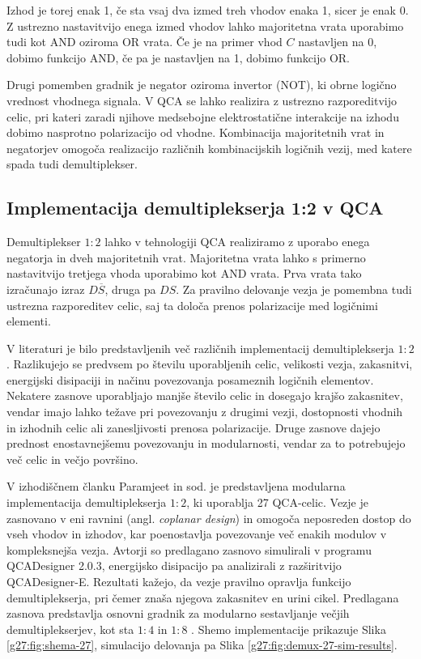 Izhod je torej enak 1, če sta vsaj dva izmed treh vhodov enaka 1, sicer je enak 0. Z ustrezno nastavitvijo enega izmed vhodov lahko majoritetna vrata uporabimo tudi kot AND oziroma OR vrata. Če je na primer vhod $C$ nastavljen na 0, dobimo funkcijo AND, če pa je nastavljen na 1, dobimo funkcijo OR.

Drugi pomemben gradnik je negator oziroma invertor (NOT), ki obrne logično vrednost vhodnega signala. V QCA se lahko realizira z ustrezno razporeditvijo celic, pri kateri zaradi njihove medsebojne elektrostatične interakcije na izhodu dobimo nasprotno polarizacijo od vhodne. Kombinacija majoritetnih vrat in negatorjev omogoča realizacijo različnih kombinacijskih logičnih vezij, med katere spada tudi demultiplekser.

\subsection{Implementacija demultiplekserja 1:2 v QCA}

Demultiplekser $1:2$ lahko v tehnologiji QCA realiziramo z uporabo enega negatorja in dveh majoritetnih vrat. Majoritetna vrata lahko s primerno nastavitvijo tretjega vhoda uporabimo kot AND vrata. Prva vrata tako izračunajo izraz $D\overline{S}$, druga pa $DS$. Za pravilno delovanje vezja je pomembna tudi ustrezna razporeditev celic, saj ta določa prenos polarizacije med logičnimi elementi.

V literaturi je bilo predstavljenih več različnih implementacij demultiplekserja $1:2$. Razlikujejo se predvsem po številu uporabljenih celic, velikosti vezja, zakasnitvi, energijski disipaciji in načinu povezovanja posameznih logičnih elementov. Nekatere zasnove uporabljajo manjše število celic in dosegajo krajšo zakasnitev, vendar imajo lahko težave pri povezovanju z drugimi vezji, dostopnosti vhodnih in izhodnih celic ali zanesljivosti prenosa polarizacije. Druge zasnove dajejo prednost enostavnejšemu povezovanju in modularnosti, vendar za to potrebujejo več celic in večjo površino.

V izhodiščnem članku Paramjeet in sod. \cite{g27:paramjeet2026} je predstavljena modularna implementacija demultiplekserja $1:2$, ki uporablja 27 QCA-celic. Vezje je zasnovano v eni ravnini (angl. \textit{coplanar design}) in omogoča neposreden dostop do vseh vhodov in izhodov, kar poenostavlja povezovanje več enakih modulov v kompleksnejša vezja. Avtorji so predlagano zasnovo simulirali v programu QCADesigner 2.0.3, energijsko disipacijo pa analizirali z razširitvijo QCADesigner-E. Rezultati kažejo, da vezje pravilno opravlja funkcijo demultiplekserja, pri čemer znaša njegova zakasnitev en urini cikel. Predlagana zasnova predstavlja osnovni gradnik za modularno sestavljanje večjih demultiplekserjev, kot sta $1:4$ in $1:8$ \cite{g27:paramjeet2026}. Shemo implementacije prikazuje Slika \ref{g27:fig:shema-27}, simulacijo delovanja pa Slika \ref{g27:fig:demux-27-sim-results}.


